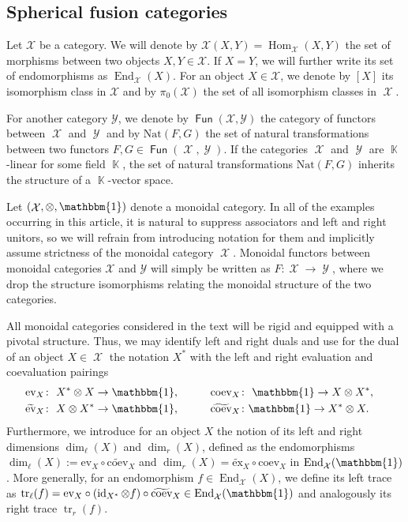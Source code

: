 \documentclass[pdftex]{sigma}
\DeclareMathOperator{\id}{id}
\DeclareMathOperator{\End}{End}
\DeclareMathOperator{\Hom}{Hom}
\DeclareMathOperator{\tr}{tr}
\DeclareMathOperator{\Fun}{\mathsf{Fun}}
\DeclareMathOperator{\K}{\mathbb{K}}
\DeclareMathOperator{\calx}{\mathcal{X}}
\DeclareMathOperator{\caly}{\mathcal{Y}}
\numberwithin{equation}{section}
\theoremstyle{definition}
\begin{document}
\subsection{Spherical fusion categories}
\label{subsecCatCon}
Let $\mathcal{X}$ be a category. We will denote by $\mathcal{X}(X,Y) = \Hom_{\mathcal{X}}(X,Y)$ the set of morphisms between two objects $X, Y \in \mathcal{X}$. If $X = Y$, we will further write its set of endomorphisms as $\End_{\calx}(X)$. For an object $X \in \mathcal{X}$, we denote by $[X]$ its isomorphism class in $\mathcal{X}$ and by $\pi_0(\mathcal{X})$ the set of all isomorphism classes in $\calx$.

For another category $\mathcal{Y}$, we denote by $\Fun(\mathcal{X}, \mathcal{Y})$ the category of functors between $\calx$ and $\caly$ and by $\mathrm{Nat}(F, G)$ the set of natural transformations between two functors $F, G \in \Fun(\calx, \caly)$. If the categories $\calx$ and $\caly$ are $\K$-linear for some field $\K$, the set of natural transformations $\mathrm{Nat}(F, G)$ inherits the structure of a $\K$-vector space.

Let $(\calx, \otimes, \mathbbm{1})$ denote a monoidal category. In all of the examples occurring in this article, it is natural to suppress associators and left and right unitors, so we will refrain from introducing notation for them and implicitly assume strictness of the monoidal category $\calx$. Monoidal functors between monoidal categories $\mathcal{X}$ and $\mathcal{Y}$ will simply be written as $F\colon \calx \rightarrow \caly$, where we drop the structure isomorphisms relating the monoidal structure of the two categories.

All monoidal categories considered in the text will be rigid and equipped with a pivotal structure. Thus, we may identify left and right duals and use for the dual of an object $X \in \calx$ the notation $X^*$ with the left and right evaluation and coevaluation pairings
\begin{alignat*}{3}
 & \mathrm{ev}_X\colon \ X^* \otimes X \rightarrow \mathbbm{1}, \qquad && \mathrm{coev}_X\colon \ \mathbbm{1} \rightarrow X \otimes X^*, & \\
 & \widetilde{\mathrm{ev}}_X\colon \ X \otimes X^* \rightarrow \mathbbm{1}, \qquad && \widetilde{\mathrm{coev}}_X\colon \mathbbm{1} \rightarrow X^* \otimes X.&
\end{alignat*}
Furthermore, we introduce for an object $X$ the notion of its left and right dimensions $\dim_{\ell}(X)$ and $\dim_r(X)$, defined as the endomorphisms $\dim_{\ell}(X) := \mathrm{ev}_X \circ \widetilde{\mathrm{coev}}_X$ and $\dim_r(X) = \widetilde{\mathrm{ex}}_X \circ \mathrm{coev}_X$ in $\End_{\calx}(\mathbbm{1})$. More generally, for an endomorphism $f \in \End_{\calx}(X)$, we define its left trace as $\tr_{\ell}(f) = \mathrm{ev}_X \circ (\id_{X^*} \otimes f) \circ \widetilde{\mathrm{coev}}_X \in \End_{\calx}(\mathbbm{1})$ and analogously its right trace $\tr_r(f)$.
\end{document}
